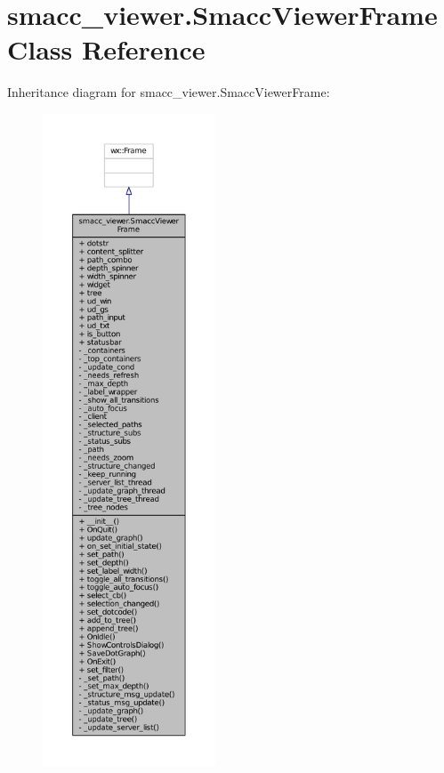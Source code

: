 \hypertarget{classsmacc__viewer_1_1SmaccViewerFrame}{}\section{smacc\+\_\+viewer.\+Smacc\+Viewer\+Frame Class Reference}
\label{classsmacc__viewer_1_1SmaccViewerFrame}


Inheritance diagram for smacc\+\_\+viewer.\+Smacc\+Viewer\+Frame\+:
\nopagebreak
\begin{figure}[H]
\begin{center}
\leavevmode
\includegraphics[height=550pt]{classsmacc__viewer_1_1SmaccViewerFrame__inherit__graph}
\end{center}
\end{figure}


